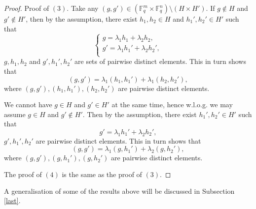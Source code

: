 \documentclass[11pt]{article}
\numberwithin{table}{section}
\newcommand{\F}{{\mathbb F}}
\newtheorem{prop}[theorem]{\bf Proposition}
\theoremstyle{definition}
\begin{document}
\begin{proof}
		
		Proof of $(3)$. Take any $(g,g') \in (\F_q^{m}\times \F_q^{n}) \setminus (H \times H')$. If $g\notin H$ and $g'\notin H'$, then by the assumption, there exist $h_1,h_2 \in H$ and $h_1',h_2' \in H'$ such that
		\begin{equation*}   
			\begin{cases}
				g=\lambda_1h_1+\lambda_2h_2,\\
				g'=\lambda_1h_1'+\lambda_2h_2',\\
			\end{cases}
		\end{equation*}
		$g,h_1,h_2$ and $g',h_1',h_2'$ are sets of pairwise distinct elements.
		This in turn shows that $$(g,g')=\lambda_1(h_1, h_1')+\lambda_1(h_2, h_2'),$$
		where $(g,g'),(h_1,h_1'),(h_2,h_2')$ are pairwise distinct elements. 
		
		We cannot have $g\in H$ and $g'\in H'$ at the same time, hence w.l.o.g. we may assume $g\in H$ and $g'\notin H'$. 
		Then by the assumption, there exist $h_1',h_2' \in H'$ such that
		\[g'=\lambda_1h_1'+\lambda_2h_2',\]
		$g', h_1', h_2'$ are pairwise distinct elements.
		This in turn shows that $$(g,g')=\lambda_1(g, h_1')+\lambda_2(g, h_2'),$$
		where $(g,g'),(g,h_1'),(g,h_2')$ are pairwise distinct elements. 
		
		The proof of $(4)$ is the same as the proof of $(3)$.\end{proof}
	
	A generalisation of some of the results above will be discussed in Subsection \ref{last}.
	
	
	
	
	
\end{document}
